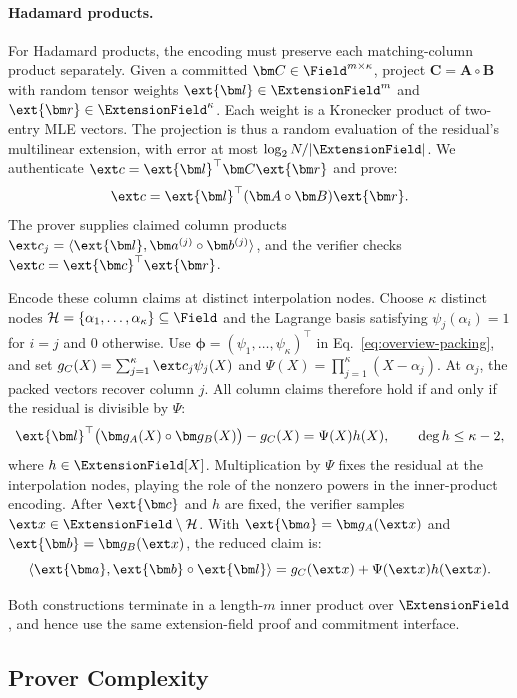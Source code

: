 \paragraph{Hadamard products.}
For Hadamard products, the encoding must preserve each
matching-column product separately.
Given a committed \(\bm C\in\Field^{m\times\kappa}\), project
\(\bm C=\bm A\circ\bm B\) with random tensor weights
\(\ext{\bm l}\in\ExtensionField^m\) and
\(\ext{\bm r}\in\ExtensionField^\kappa\).
Each weight is a Kronecker product of two-entry MLE vectors.
The projection is thus a random evaluation of the residual's
multilinear extension, with error at most
\(\log_2N/|\ExtensionField|\).
We authenticate \(\ext c=\ext{\bm l}^{\top}\bm C\ext{\bm r}\) and prove:
\[
    \ext c=\ext{\bm l}^{\top}(\bm A\circ\bm B)\ext{\bm r}.
\]
The prover supplies claimed column products
\(\ext c_j=\langle\ext{\bm l},
\bm a^{(j)}\circ\bm b^{(j)}\rangle\), and the verifier checks
\(\ext c=\ext{\bm c}^{\top}\ext{\bm r}\).

Encode these column claims at distinct interpolation nodes.
Choose \(\kappa\) distinct nodes
\(\mathcal H=\{\alpha_1,\ldots,\alpha_\kappa\}\subseteq\Field\)
and the Lagrange basis satisfying
\(\psi_j(\alpha_i)=1\) for \(i=j\) and \(0\) otherwise.
Use \(\bm\phi=(\psi_1,\ldots,\psi_\kappa)^\top\) in
Eq.~\eqref{eq:overview-packing}, and set
\(g_C(X)=\sum_{j=1}^{\kappa}\ext c_j\psi_j(X)\) and
\(\Psi(X)=\prod_{j=1}^{\kappa}(X-\alpha_j)\).
At \(\alpha_j\), the packed vectors recover column \(j\).
All column claims therefore hold if and only if the residual is
divisible by \(\Psi\):
\begin{equation*}
    \ext{\bm l}^{\top}
      \bigl(\bm g_A(X)\circ\bm g_B(X)\bigr)-g_C(X)
    =\Psi(X)h(X),
    \qquad \deg h\leq\kappa-2,
\end{equation*}
where \(h\in\ExtensionField[X]\).
Multiplication by \(\Psi\) fixes the residual at the interpolation
nodes, playing the role of the nonzero powers in the inner-product
encoding.
After \(\ext{\bm c}\) and \(h\) are fixed, the verifier samples
\(\ext x\in\ExtensionField\setminus\mathcal H\).
With \(\ext{\bm a}=\bm g_A(\ext x)\) and
\(\ext{\bm b}=\bm g_B(\ext x)\), the reduced claim is:
\[
    \langle\ext{\bm a},\ext{\bm b}\circ\ext{\bm l}\rangle
    =g_C(\ext x)+\Psi(\ext x)h(\ext x).
\]

Both constructions terminate in a length-\(m\) inner product over
\(\ExtensionField\), and hence use the same extension-field proof
and commitment interface.

\subsection{Prover Complexity}
\label{sec:highLevelEfficiency}

